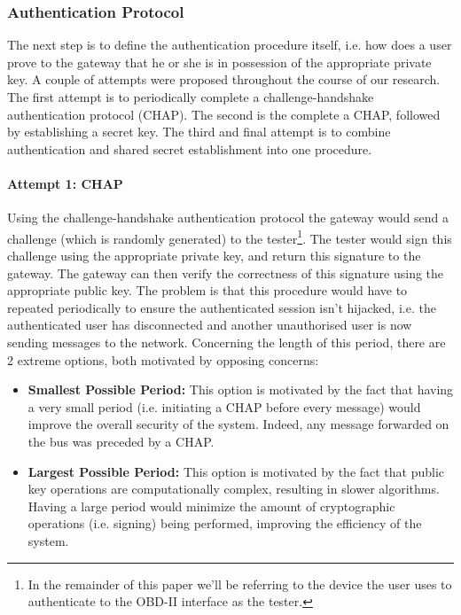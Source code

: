 \documentclass[11pt]{article}
\begin{document}
\subsubsection{Authentication Protocol}
\label{sec:authentication_protocol}

The next step is to define the authentication procedure itself, i.e. how does a user prove to the gateway that he or she is in possession of the appropriate private key. A couple of attempts were proposed throughout the course of our research. The first attempt is to periodically complete a challenge-handshake authentication protocol (CHAP). The second is the complete a CHAP, followed by establishing a secret key. The third and final attempt is to combine authentication and shared secret establishment into one procedure.

\paragraph{Attempt 1: CHAP} Using the challenge-handshake authentication protocol the gateway would send a challenge (which is randomly generated) to the tester\footnote{In the remainder of this paper we'll be referring to the device the user uses to authenticate to the OBD-II interface as the tester.}. The tester would sign this challenge using the appropriate private key, and return this signature to the gateway. The gateway can then verify the correctness of this signature using the appropriate public key. The problem is that this procedure would have to repeated periodically to ensure the authenticated session isn't hijacked, i.e. the authenticated user has disconnected and another unauthorised user is now sending messages to the network. Concerning the length of this period, there are 2 extreme options, both motivated by opposing concerns:

\begin{itemize}
	\item \textbf{Smallest Possible Period:} This option is motivated by the fact that having a very small period (i.e. initiating a CHAP before every message) would improve the overall security of the system. Indeed, any message forwarded on the bus was preceded by a CHAP.
	
	\item \textbf{Largest Possible Period:} This option is motivated by the fact that public key operations are computationally complex, resulting in slower algorithms. Having a large period would minimize the amount of cryptographic operations (i.e. signing) being performed, improving the efficiency of the system.	
\end{itemize}
\end{document}
